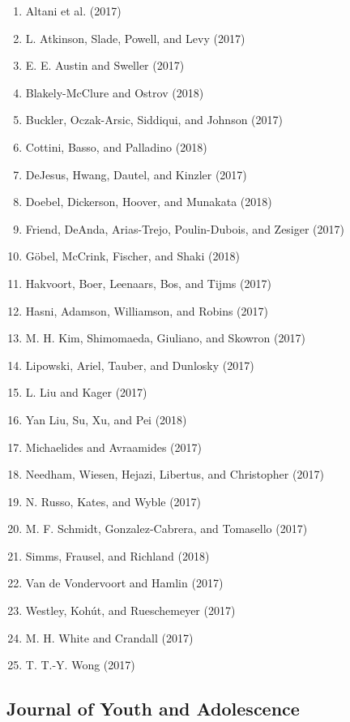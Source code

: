 \documentclass[english,man]{apa6}
\providecommand{\tightlist}{%
  \setlength{\itemsep}{0pt}\setlength{\parskip}{0pt}}
\theoremstyle{definition}
\theoremstyle{definition}
\theoremstyle{definition}
\theoremstyle{remark}
\begin{document}
\begin{enumerate}
\def\labelenumi{\arabic{enumi})}
\tightlist
\item
  Altani et al. (2017)
\item
  L. Atkinson, Slade, Powell, and Levy (2017)
\item
  E. E. Austin and Sweller (2017)
\item
  Blakely-McClure and Ostrov (2018)
\item
  Buckler, Oczak-Arsic, Siddiqui, and Johnson (2017)
\item
  Cottini, Basso, and Palladino (2018)
\item
  DeJesus, Hwang, Dautel, and Kinzler (2017)
\item
  Doebel, Dickerson, Hoover, and Munakata (2018)
\item
  Friend, DeAnda, Arias-Trejo, Poulin-Dubois, and Zesiger (2017)
\item
  Göbel, McCrink, Fischer, and Shaki (2018)
\item
  Hakvoort, Boer, Leenaars, Bos, and Tijms (2017)
\item
  Hasni, Adamson, Williamson, and Robins (2017)
\item
  M. H. Kim, Shimomaeda, Giuliano, and Skowron (2017)
\item
  Lipowski, Ariel, Tauber, and Dunlosky (2017)
\item
  L. Liu and Kager (2017)
\item
  Yan Liu, Su, Xu, and Pei (2018)
\item
  Michaelides and Avraamides (2017)
\item
  Needham, Wiesen, Hejazi, Libertus, and Christopher (2017)
\item
  N. Russo, Kates, and Wyble (2017)
\item
  M. F. Schmidt, Gonzalez-Cabrera, and Tomasello (2017)
\item
  Simms, Frausel, and Richland (2018)
\item
  Van de Vondervoort and Hamlin (2017)
\item
  Westley, Kohút, and Rueschemeyer (2017)
\item
  M. H. White and Crandall (2017)
\item
  T. T.-Y. Wong (2017)
\end{enumerate}

\subsection{Journal of Youth and
Adolescence}\label{journal-of-youth-and-adolescence}
\end{document}
